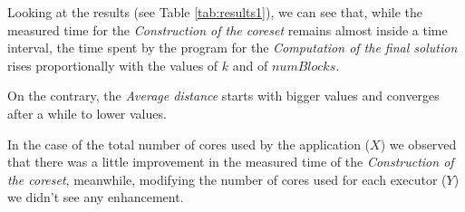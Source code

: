\documentclass[10pt]{article}
\begin{document}
Looking at the results (see Table \ref{tab:results1}), we can see that, while the measured time for the \textit{Construction of the coreset} remains almost inside a time interval, the time spent by the program for the \textit{Computation of the final solution} rises proportionally with the values of $k$ and of $numBlocks$.

On the contrary, the \textit{Average distance} starts with bigger values and converges after a while to lower values.

In the case of the total number of cores used by the application ($X$) we observed that there was a little improvement in the measured time of the \textit{Construction of the coreset}, meanwhile, modifying the number of cores used for each executor ($Y$) we didn't see any enhancement.
\end{document}
